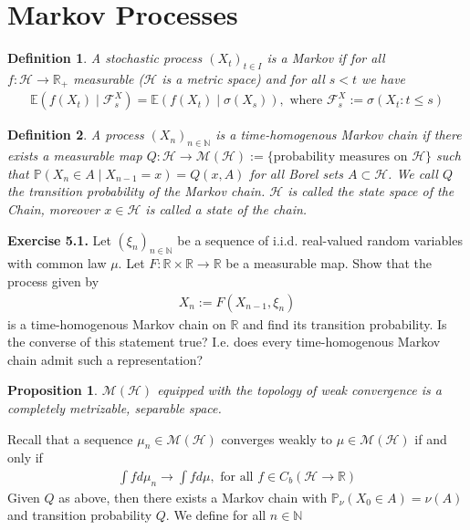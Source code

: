 \documentclass[11pt,a4paper, final]{article}
\newtheorem{prop}{Proposition}[section]
\newtheorem{defn}{Definition}[section]
\theoremstyle{definition}
\begin{document}
\section{Markov Processes}
\begin{defn}
A stochastic process $(X_t)_{t \in I}$ is a Markov if for all \\ $f: \mathcal{H} \to \mathbb{R}_+$ measurable ($\mathcal{H}$ is a metric space) and for all $s <t$ we have 
\begin{align*}
\mathbb{E}(f(X_t) \mid \mathcal{F}_s^X ) = \mathbb{E}(f (X_t) \mid \sigma (X_s)), \text{ where } \mathcal{F}_s^X := \sigma ( X_t : t \leq s )  
\end{align*}
\end{defn}
\begin{defn} A process $(X_n)_{n \in \mathbb{N}}$ is a time-homogenous Markov chain if there exists a measurable map $Q: \mathcal{H} \to \mathcal{M}( \mathcal{H}):= \lbrace \text{probability measures on } \mathcal{H} \rbrace$ such that $\mathbb{P}(X_n \in A \mid X_{n-1} = x ) = Q(x,A)$ for all Borel sets $A \subset \mathcal{H}$. We call $Q$ the transition probability of the Markov chain. $\mathcal{H}$ is called the state space of the Chain, moreover $x \in \mathcal{H}$ is called a state of the chain. 
\end{defn}
\noindent \textbf{Exercise 5.1.} Let $( \xi_n)_{n \in \mathbb{N}}$ be a sequence of i.i.d. real-valued random variables with common law $\mu$. Let $F: \mathbb{R} \times \mathbb{R} \to \mathbb{R}$ be a measurable map. Show that the process given by 
\begin{align*}
X_n:= F(X_{n-1}, \xi_n)
\end{align*}
is a time-homogenous Markov chain on $\mathbb{R}$ and find its transition probability. Is the converse of this statement true? I.e. does every time-homogenous Markov chain admit such a representation?
\begin{prop} $\mathcal{M}( \mathcal{H})$ equipped with the topology of weak convergence is a completely metrizable, separable space. 
\end{prop}
\noindent Recall that a sequence $\mu_n \in \mathcal{M}( \mathcal{H})$ converges weakly to $\mu \in \mathcal{M}( \mathcal{H})$ if and only if 
\begin{align*}
 \int f d \mu_n \to \int f d \mu, \text{ for all } f \in C_b ( \mathcal{H} \to \mathbb{R})
\end{align*}
\noindent Given $Q$ as above, then there exists a Markov chain with $\mathbb{P}_\nu ( X_0 \in A) = \nu (A)$ and transition probability $Q$. We define for all $n  \in \mathbb{N}$ 
\end{document}
